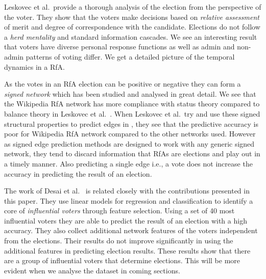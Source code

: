 Leskovec et al.\ provide a thorough analysis of the election from the perspective of the voter. They show that the voters make decisions based on \textit{relative assessment} of merit and degree of correspondence with the candidate. Elections do not follow a \textit{herd mentality} and standard information cascades. We see an interesting result that voters have diverse personal response functions as well as admin and non-admin patterns of voting differ. \cite{leskovec2010governance} We get a detailed picture of the temporal dynamics in a RfA.

As the votes in an RfA election can be positive or negative they can form a \textit{signed network} which has been studied and analysed in great detail. We see that the Wikipedia RfA network has more compliance with status theory compared to balance theory in Leskovec et al.\ \cite{leskovecSigned}. When Leskovec et al.\ try and use these signed structural properties to predict edges in \cite{leskovecPredicting}, they see that the predictive accuracy is poor for Wikipedia RfA network compared to the other networks used. However as signed edge prediction methods are designed to work with any generic signed network, they tend to discard information that RfAs are elections and play out in a timely manner. Also predicting a single edge i.e., a vote does not increase the accuracy in predicting the result of an election.   

The work of Desai et al.\ \cite{desai2014result} is related closely with the contributions presented in this paper. They use linear models for regression and classification to identify a core of \textit{influential voters} through feature selection. Using a set of 40 most influential voters they are able to predict the result of an election with a high accuracy. They also collect additional network features of the voters independent from the elections. Their results do not improve significantly in using the additional features in predicting election results. These results show that there are a group of influential voters that determine elections. This will be more evident when we analyse the dataset in coming sections.
